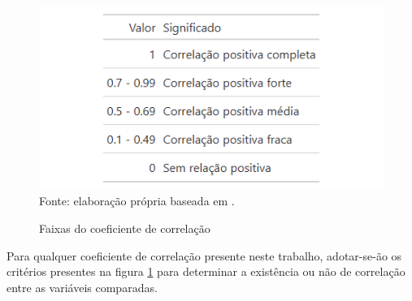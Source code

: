 \begin{figure}[H]
    \centering
    \caption{Faixas do coeficiente de correlação}
    \includegraphics[width=1\linewidth]{figuras/tabela_faixas_correlacao}
    \label{fig:tabela_faixas_correlacao}
    \footnotesize{Fonte: elaboração própria baseada em \cite{ali2022spearman}.}
\end{figure}

Para qualquer coeficiente de correlação presente neste trabalho, adotar-se-ão os critérios presentes na figura \ref{fig:tabela_faixas_correlacao} para determinar a existência ou não de correlação entre as variáveis comparadas.
